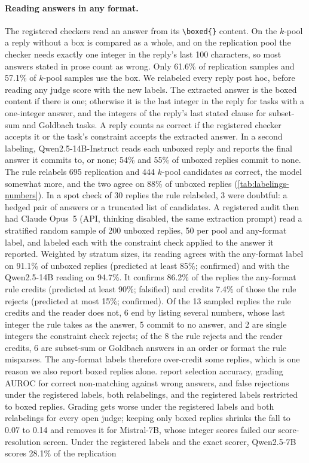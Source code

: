 \paragraph{Reading answers in any format.}
The registered checkers read an answer from its \texttt{\textbackslash boxed\{\}} content. On the $k$-pool a reply without a box is compared as a whole, and on the replication pool the checker needs exactly one integer in the reply's last 100 characters, so most answers stated in prose count as wrong. Only 61.6\% of replication samples and 57.1\% of $k$-pool samples use the box.
We relabeled every reply post hoc, before reading any judge score with the new labels. The extracted answer is the boxed content if there is one; otherwise it is the last integer in the reply for tasks with a one-integer answer, and the integers of the reply's last stated clause for subset-sum and Goldbach tasks. A reply counts as correct if the registered checker accepts it or the task's constraint accepts the extracted answer. In a second labeling, Qwen2.5-14B-Instruct reads each unboxed reply and reports the final answer it commits to, or none; 54\% and 55\% of unboxed replies commit to none. The rule relabels 695 replication and 444 $k$-pool candidates as correct, the model somewhat more, and the two agree on 88\% of unboxed replies (\cref{tab:labelings-numbers}). In a spot check of 30 replies the rule relabeled, 3 were doubtful: a hedged pair of answers or a truncated list of candidates. A registered audit then had Claude Opus~5 (API, thinking disabled, the same extraction prompt) read a stratified random sample of 200 unboxed replies, 50 per pool and any-format label, and labeled each with the constraint check applied to the answer it reported. Weighted by stratum sizes, its reading agrees with the any-format label on 91.1\% of unboxed replies (predicted at least 85\%; confirmed) and with the Qwen2.5-14B reading on 94.7\%. It confirms 86.2\% of the replies the any-format rule credits (predicted at least 90\%; falsified) and credits 7.4\% of those the rule rejects (predicted at most 15\%; confirmed). Of the 13 sampled replies the rule credits and the reader does not, 6 end by listing several numbers, whose last integer the rule takes as the answer, 5 commit to no answer, and 2 are single integers the constraint check rejects; of the 8 the rule rejects and the reader credits, 6 are subset-sum or Goldbach answers in an order or format the rule misparses. The any-format labels therefore over-credit some replies, which is one reason we also report boxed replies alone.
 report selection accuracy, grading AUROC for correct non-matching against wrong answers, and false rejections under the registered labels, both relabelings, and the registered labels restricted to boxed replies. Grading gets worse under the registered labels and both relabelings for every open judge; keeping only boxed replies shrinks the fall to 0.07 to 0.14 and removes it for Mistral-7B, whose integer scores failed our score-resolution screen. Under the registered labels and the exact scorer, Qwen2.5-7B scores 28.1\% of the replication
